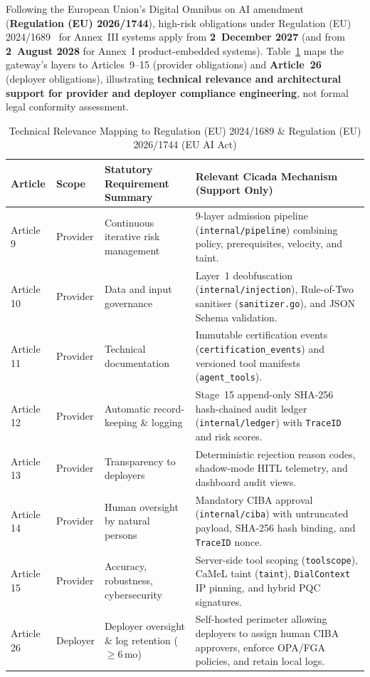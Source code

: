 \documentclass[11pt, a4paper]{article}
\begin{document}
Following the European Union's Digital Omnibus on AI amendment (\textbf{Regulation (EU) 2026/1744}), high-risk obligations under Regulation (EU) 2024/1689~\cite{euaiact2024} for Annex~III systems apply from \textbf{2~December 2027} (and from \textbf{2~August 2028} for Annex~I product-embedded systems). Table~\ref{tab:eu-ai-act} maps the gateway's layers to Articles~9--15 (provider obligations) and \textbf{Article~26} (deployer obligations), illustrating \textbf{technical relevance and architectural support for provider and deployer compliance engineering}, not formal legal conformity assessment.

\begin{table}[htbp]
\centering
\caption{Technical Relevance Mapping to Regulation (EU) 2024/1689 \& Regulation (EU) 2026/1744 (EU AI Act)}
\label{tab:eu-ai-act}
\begin{small}
\begin{tabular}{@{} l l p{4.2cm} p{6.8cm} @{}}
\toprule
\textbf{Article} & \textbf{Scope} & \textbf{Statutory Requirement Summary} & \textbf{Relevant Cicada Mechanism (Support Only)} \\
\midrule
Article 9  & Provider & Continuous iterative risk management & 9-layer admission pipeline (\texttt{internal/pipeline}) combining policy, prerequisites, velocity, and taint. \\
Article 10 & Provider & Data and input governance & Layer~1 deobfuscation (\texttt{internal/injection}), Rule-of-Two sanitiser (\texttt{sanitizer.go}), and JSON Schema validation. \\
Article 11 & Provider & Technical documentation & Immutable certification events (\texttt{certification\_events}) and versioned tool manifests (\texttt{agent\_tools}). \\
Article 12 & Provider & Automatic record-keeping \& logging & Stage~15 append-only SHA-256 hash-chained audit ledger (\texttt{internal/ledger}) with \texttt{TraceID} and risk scores. \\
Article 13 & Provider & Transparency to deployers & Deterministic rejection reason codes, shadow-mode HITL telemetry, and dashboard audit views. \\
Article 14 & Provider & Human oversight by natural persons & Mandatory CIBA approval (\texttt{internal/ciba}) with untruncated payload, SHA-256 hash binding, and \texttt{TraceID} nonce. \\
Article 15 & Provider & Accuracy, robustness, cybersecurity & Server-side tool scoping (\texttt{toolscope}), CaMeL taint (\texttt{taint}), \texttt{DialContext} IP pinning, and hybrid PQC signatures. \\
Article 26 & Deployer & Deployer oversight \& log retention ($\ge 6$\,mo) & Self-hosted perimeter allowing deployers to assign human CIBA approvers, enforce OPA/FGA policies, and retain local logs. \\
\bottomrule
\end{tabular}
\end{small}
\end{table}
\end{document}
